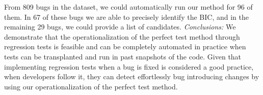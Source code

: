 From 809 bugs in the dataset, we could automatically run our method for 96 of them. 
In 67 of these bugs we are able to precisely identify the BIC, and in the remaining 29 bugs, we could provide a list of candidates.
\textit{Conclusions:} 
We demonstrate that the operationalization of the perfect test method through regression tests is feasible and can be completely automated in practice when tests can be transplanted and run in past snapshots of the code. Given that implementing regression tests when a bug is fixed is considered a good practice, when developers follow it, they can detect effortlessly bug introducing changes by using our operationalization of the perfect test method.

